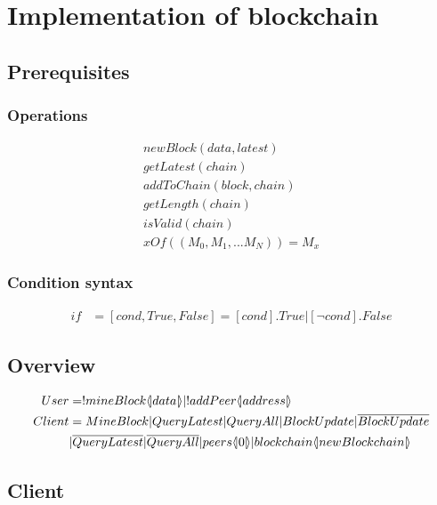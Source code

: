 \section{Implementation of blockchain}

\subsection{Prerequisites}

\subsubsection{Operations}

\begin{align*}
    newBlock(data,latest)\\
    getLatest(chain)\\
    addToChain(block,chain)\\
    getLength(chain)\\
    isValid(chain)\\
    xOf((M_0,M_1,...M_N))=M_x
\end{align*}

\subsubsection{Condition syntax}

\begin{align*}
    if &= [cond,True,False] = [cond].True|[\neg cond].False
\end{align*}

\subsection{Overview}

\begin{align*}
    User &= !mineBlock \lift{}{data} |!addPeer\lift{}{address}\\
    Client &= MineBlock|QueryLatest|QueryAll|BlockUpdate|\overline{BlockUpdate}\\
    &|\overline{QueryLatest}|\overline{QueryAll}|peers\lift{}{0}|blockchain\lift{}{newBlockchain}
\end{align*}

\subsection{Client}

